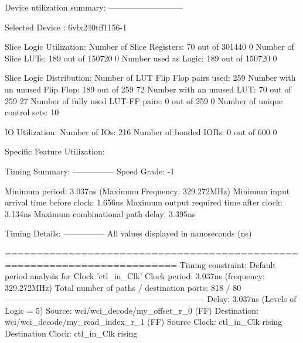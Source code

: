 \documentclass{article}
\begin{document}
Device utilization summary:
---------------------------

Selected Device : 6vlx240tff1156-1 


Slice Logic Utilization: 
 Number of Slice Registers:              70  out of  301440     0%
 Number of Slice LUTs:                  189  out of  150720     0%
    Number used as Logic:               189  out of  150720     0%

Slice Logic Distribution: 
 Number of LUT Flip Flop pairs used:    259
   Number with an unused Flip Flop:     189  out of    259    72%
   Number with an unused LUT:            70  out of    259    27%
   Number of fully used LUT-FF pairs:     0  out of    259     0%
   Number of unique control sets:        10

IO Utilization: 
 Number of IOs:                         216
 Number of bonded IOBs:                   0  out of    600     0%

Specific Feature Utilization:

\fi
\iffalse
Timing Summary:
---------------
Speed Grade: -1

   Minimum period: 3.037ns (Maximum Frequency: 329.272MHz)
   Minimum input arrival time before clock: 1.656ns
   Maximum output required time after clock: 3.134ns
   Maximum combinational path delay: 3.395ns

Timing Details:
---------------
All values displayed in nanoseconds (ns)

=========================================================================
Timing constraint: Default period analysis for Clock 'ctl_in_Clk'
  Clock period: 3.037ns (frequency: 329.272MHz)
  Total number of paths / destination ports: 818 / 80
-------------------------------------------------------------------------
Delay:               3.037ns (Levels of Logic = 5)
  Source:            wci/wci_decode/my_offset_r_0 (FF)
  Destination:       wci/wci_decode/my_read_index_r_1 (FF)
  Source Clock:      ctl_in_Clk rising
  Destination Clock: ctl_in_Clk rising
\end{document}
